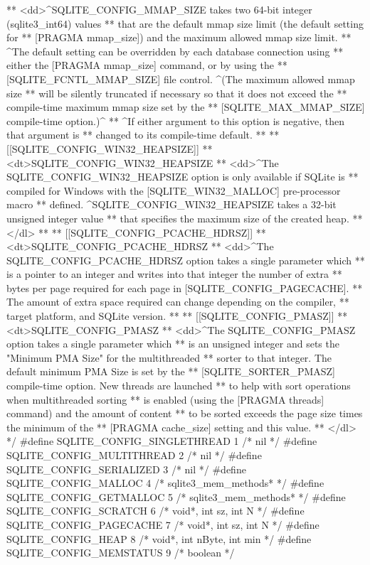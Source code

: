 \begin{Codex}[label=sqlite3.h,numbers=left]
{** <dd>^SQLITE_CONFIG_MMAP_SIZE takes two 64-bit integer (sqlite3_int64) values
** that are the default mmap size limit (the default setting for
** [PRAGMA mmap_size]) and the maximum allowed mmap size limit.
** ^The default setting can be overridden by each database connection using
** either the [PRAGMA mmap_size] command, or by using the
** [SQLITE_FCNTL_MMAP_SIZE] file control.  ^(The maximum allowed mmap size
** will be silently truncated if necessary so that it does not exceed the
** compile-time maximum mmap size set by the
** [SQLITE_MAX_MMAP_SIZE] compile-time option.)^
** ^If either argument to this option is negative, then that argument is
** changed to its compile-time default.
**
** [[SQLITE_CONFIG_WIN32_HEAPSIZE]]
** <dt>SQLITE_CONFIG_WIN32_HEAPSIZE
** <dd>^The SQLITE_CONFIG_WIN32_HEAPSIZE option is only available if SQLite is
** compiled for Windows with the [SQLITE_WIN32_MALLOC] pre-processor macro
** defined. ^SQLITE_CONFIG_WIN32_HEAPSIZE takes a 32-bit unsigned integer value
** that specifies the maximum size of the created heap.
** </dl>
**
** [[SQLITE_CONFIG_PCACHE_HDRSZ]]
** <dt>SQLITE_CONFIG_PCACHE_HDRSZ
** <dd>^The SQLITE_CONFIG_PCACHE_HDRSZ option takes a single parameter which
** is a pointer to an integer and writes into that integer the number of extra
** bytes per page required for each page in [SQLITE_CONFIG_PAGECACHE].
** The amount of extra space required can change depending on the compiler,
** target platform, and SQLite version.
**
** [[SQLITE_CONFIG_PMASZ]]
** <dt>SQLITE_CONFIG_PMASZ
** <dd>^The SQLITE_CONFIG_PMASZ option takes a single parameter which
** is an unsigned integer and sets the "Minimum PMA Size" for the multithreaded
** sorter to that integer.  The default minimum PMA Size is set by the
** [SQLITE_SORTER_PMASZ] compile-time option.  New threads are launched
** to help with sort operations when multithreaded sorting
** is enabled (using the [PRAGMA threads] command) and the amount of content
** to be sorted exceeds the page size times the minimum of the
** [PRAGMA cache_size] setting and this value.
** </dl>
*/
#define SQLITE_CONFIG_SINGLETHREAD  1  /* nil */
#define SQLITE_CONFIG_MULTITHREAD   2  /* nil */
#define SQLITE_CONFIG_SERIALIZED    3  /* nil */
#define SQLITE_CONFIG_MALLOC        4  /* sqlite3_mem_methods* */
#define SQLITE_CONFIG_GETMALLOC     5  /* sqlite3_mem_methods* */
#define SQLITE_CONFIG_SCRATCH       6  /* void*, int sz, int N */
#define SQLITE_CONFIG_PAGECACHE     7  /* void*, int sz, int N */
#define SQLITE_CONFIG_HEAP          8  /* void*, int nByte, int min */
#define SQLITE_CONFIG_MEMSTATUS     9  /* boolean */
}
\end{Codex}
